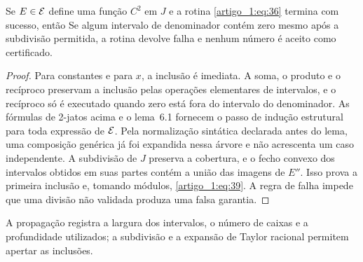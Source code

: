 \begin{proposicao}\label{map:artigo_1:6.2}
Se $E\in\mathcal E$ define uma função $C^2$ em $J$ e a rotina \eqref{artigo_1:eq:36} termina com sucesso, então
Se algum intervalo de denominador contém zero mesmo após a subdivisão permitida, a rotina devolve falha e nenhum número é aceito como certificado.
\end{proposicao}
\begin{proof}
Para constantes e para $x$, a inclusão é imediata. A soma, o produto e o recíproco preservam a inclusão pelas operações elementares de intervalos, e o recíproco só é executado quando zero está fora do intervalo do denominador. As fórmulas de 2-jatos acima e o lema~6.1 fornecem o passo de indução estrutural para toda expressão de $\mathcal E$. Pela normalização sintática declarada antes do lema, uma composição genérica já foi expandida nessa árvore e não acrescenta um caso independente. A subdivisão de $J$ preserva a cobertura, e o fecho convexo dos intervalos obtidos em suas partes contém a união das imagens de $E''$. Isso prova a primeira inclusão e, tomando módulos, \eqref{artigo_1:eq:39}. A regra de falha impede que uma divisão não validada produza uma falsa garantia.
\end{proof}
A propagação registra a largura dos intervalos, o número de caixas e a profundidade utilizados; a subdivisão e a expansão de Taylor racional permitem apertar as inclusões.

